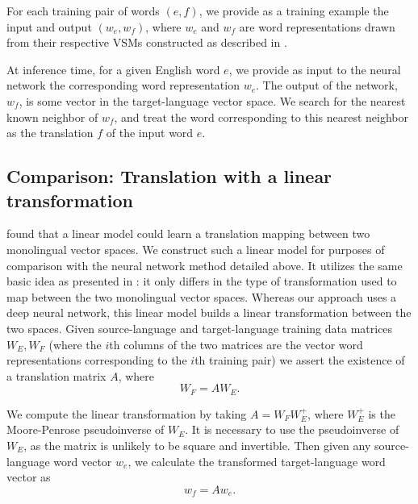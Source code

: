 \documentclass[11pt]{article}
\begin{document}
For each training pair of words $(e, f)$, we provide as a training example the
input and output $(w_e, w_f)$, where $w_e$ and $w_f$ are word representations
drawn from their respective VSMs constructed as described in
.

At inference time, for a given English word $e$, we provide as input to the
neural network the corresponding word representation $w_e$. The output of the
network, $w_f$, is some vector in the target-language vector space. We search
for the nearest known neighbor of $w_f$, and treat the word corresponding to
this nearest neighbor as the translation $f$ of the input word $e$.

\subsection{Comparison: Translation with a linear transformation}
\label{subsec:translation-linear}

 found that a linear model could learn a
translation mapping between two monolingual vector spaces. We construct such a
linear model for purposes of comparison with the neural network method detailed
above. It utilizes the same basic idea as presented in :
it only differs in the type of transformation used to map between the two
monolingual vector spaces. Whereas our approach uses a deep neural network, this
linear model builds a linear transformation between the two spaces. Given
source-language and target-language training data matrices $W_E, W_F$ (where the
$i$th columns of the two matrices are the vector word representations
corresponding to the $i$th training pair) we assert the existence of a
translation matrix $A$, where
\begin{equation}
  W_F = AW_E.
\end{equation}

We compute the linear transformation by taking $A = W_F W_E^+$, where $W_E^+$ is
the Moore-Penrose pseudoinverse of $W_E$. It is necessary to use the
pseudoinverse of $W_E$, as the matrix is unlikely to be square and invertible.
Then given any source-language word vector $w_e$, we calculate the transformed
target-language word vector as
\begin{equation}
  w_f = A w_e.
\end{equation}
\end{document}
